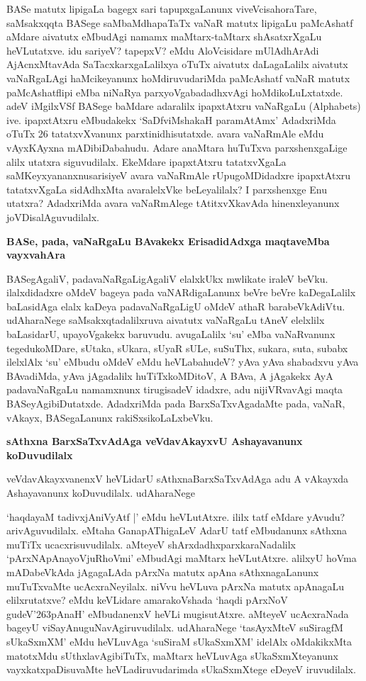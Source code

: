 \noindent
BASe matutx lipigaLa bagegx sari tapupxgaLanunx viveVcisahoraTare, saMsakxqqta BASege saMbaMdhapaTaTx vaNaR matutx lipigaLu paMcAshatf aMdare aivatutx eMbudAgi namamx maMtarx-taMtarx shAsatxrXgaLu heVLutatxve. idu sariyeV? tapepxV? eMdu AloVcisidare mUlAdhArAdi AjAcnxMtavAda SaTacxkarxgaLalilxya oTuTx aivatutx daLagaLalilx aivatutx vaNaRgaLAgi haMcikeyanunx hoMdiruvudariMda paMcAshatf vaNaR matutx paMcAshatflipi eMba niNaRya parxyoVgabadadhxvAgi hoMdikoLuLxtatxde. adeV iMgilxVSf BASege baMdare adaralilx ipapx\-tAtxru vaNaRgaLu {\rm (Alphabets)} ive. ipapxtAtxru eMbudakekx `SaDfviMshakaH paramAtAmx' AdadxriMda oTuTx 26 tatatxvXvanunx parxtinidhisutatxde. avara vaNaRmAle eMdu vAyxKAyxna mADibiDabahudu. Adare anaMtara huTuTxva parxshenxgaLige alilx utatxra siguvudilalx. EkeMdare ipapxtAtxru tatatxvXgaLa saMKeyxyananxnusarisiyeV avara vaNaRmAle rUpugoMDidadxre ipapxtAtxru tatatxvXgaLa sidAdhxMta avaralelxVke beLeyalilalx? I parxshenxge Enu utatxra? AdadxriMda avara vaNaRmAlege tAtitxvXkavAda hinenxleyanunx joVDisalAguvudilalx.

{\bigskip
\noindent
{\large\bf BASe, pada, vaNaRgaLu BAvakekx ErisadidAdxga maqtaveMba vayxvahAra}}\label{page185}
\medskip

\noindent
BASegAgaliV, padavaNaRgaLigAgaliV elalxkUkx mwlikate iraleV beVku. ilalxdidadxre oMdeV bageya pada vaNARdigaLanunx beVre beVre kaDegaLalilx baLasidAga elalx kaDeya padavaNaRgaLigU oMdeV athaR barabeVkAdiVtu. udAharaNege saMsakxqtadalilxruva aivatutx vaNaRgaLu tAneV elelxlilx baLasidarU, upa\-yoVgakekx baruvudu. avugaLalilx `su' eMba vaNaRvanunx tegedukoMDare, sUtaka, sUkara, sUyaR sULe, suSuThx, sukara, suta, subabx ilelxlAlx `su' eMbudu oMdeV eMdu heVLabahudeV? yAva yAva shabadxvu yAva BAvadiMda, yAva jAgadalilx huTiTxkoMDitoV, A BAva, A jAgakekx AyA padavaNaR\-gaLu namamxnunx tirugisadeV idadxre, adu nijiVRvavAgi maqta BASeyAgibiDutatxde. AdadxriMda pada BarxSaTx\-vAgadaMte pada, vaNaR, vAkayx, BASegaLanunx rakiSxsikoLaLxbeVku.


{\bigskip
\noindent
{\large\bf sAthxna BarxSaTxvAdAga veVdavAkayxvU Ashayavanunx koDuvudilalx}}\label{page186}
\medskip

\noindent
veVdavAkayxvanenxV heVLidarU sAthxnaBarxSaTxvAdAga adu A vAkayxda Ashayavanunx koDuvudilalx. udA\-haraNege

`haqdayaM tadivxjAniVyAtf |'\label{186} eMdu heVLutAtxre. ililx tatf eMdare yAvudu? arivAguvu\-dilalx. eMtaha GanapAThigaLeV AdarU tatf eMbudanunx sAthxna muTiTx ucacxrisuvudilalx. aMteyeV shArxdadhx\-parxkaraNadalilx `pArxNApAnayoVjuRhoVmi'\label{186} eMbudAgi maMtarx heVLutAtxre. alilxyU hoVma mADa\-beVkAda jAgagaLAda pArxNa matutx apAna sAthxnagaLanunx muTuTxvaMte ucAcxraNeyilalx. niVvu heVLuva pArxNa matutx apAnagaLu elilxrutatxve? eMdu keVLidare amarakoVshada `haqdi pArxNoV gudeV\char'263pAnaH' eMbu\-danenxV heVLi mugisutAtxre. aMteyeV ucAcxraNada bageyU viSayAnuguNavAgiruvudilalx. udA\-haraNege `tasAyxMteV suSiragfM sUkaSxmXM'\label{124} eMdu heVLuvAga `suSiraM sUkaSxmXM' idelAlx oMdakikxMta \-matotxMdu sUthxlavAgibiTuTx, maMtarx heVLuvAga sUkaSxmXteyanunx vayxkatxpaDisuvaMte heVLadiruvudarimda sUkaSxmXtege eDeyeV iruvudilalx. 

